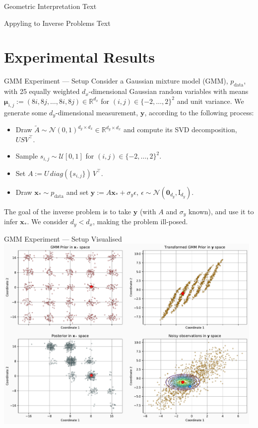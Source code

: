 \documentclass{beamer}
\begin{document}
    \begin{frame}{Geometric Interpretation}
        Text
    \end{frame}

    \begin{frame}{Appyling to Inverse Problems}
        Text
    \end{frame}

    \section{Experimental Results}

    \begin{frame}{GMM Experiment --- Setup}
        Consider a Gaussian mixture model (GMM), $p_{\text{data}}$, with 25 equally weighted
        $d_x$-dimensional Gaussian random variables with means
        $\mathbf{\mu}_{i,j} := (8i, 8j, \dots, 8i, 8j) \in \mathbb{R}^{d_x}$
        for $(i, j)\in \{-2, \ldots, 2\}^2$ and unit variance.
        We generate some $d_y$-dimensional measurement, $\mathbf{y}$, according to the following process:
        \begin{itemize}
            \item Draw $\tilde{A} \sim \mathcal{N}(0, 1)^{d_y \times d_x} \in \mathbb{R}^{d_y \times d_x}$
            and compute its SVD decomposition, $USV^\top$.
            \item Sample $s_{i,j} \sim \mathcal{U}[0,1]$ for $(i,j) \in \{-2, \dots, 2\}^2$.
            \item Set $A := U\, diag(\{s_{i,j}\})\, V^\top$.
            \item Draw $\mathbf{x}_* \sim p_{\text{data}}$ and set $\mathbf{y} := A\mathbf{x}_* + \sigma_y\epsilon,\ \epsilon \sim \mathcal{N}(\mathbf{0}_{d_y}, \mathrm{I}_{d_y})$.
        \end{itemize}
        The goal of the inverse problem is to take $\mathbf{y}$ (with $A$ and $\sigma_y$ known), and use
        it to infer $\mathbf{x}_*$. We consider $d_y < d_x$, making the problem ill-posed.
    \end{frame}

    \begin{frame}{GMM Experiment --- Setup Visualised}
        \centering
        \includegraphics[width=0.98\textwidth]{assets/gmm-measurement-system.pdf}
    \end{frame}
\end{document}
